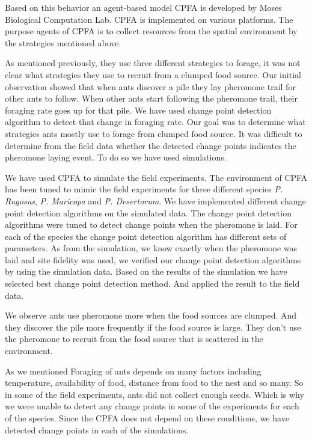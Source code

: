 Based on this behavior an agent-based model CPFA\cite{hecker2015beyond} is developed by Moses Biological Computation Lab. CPFA is implemented on various platforms. The purpose agents of CPFA is to collect resources from the spatial environment by the strategies mentioned above. 

As mentioned previously, they use three different strategies to forage\cite{collett2010desert,flanagan2012quantifying}, it was not clear what strategies they use to recruit from a clumped food source\cite{tarasewich2002swarm}. Our initial observation showed that when ants discover a pile they lay pheromone trail for other ants to follow. When other ants start following the pheromone trail, their foraging rate goes up for that pile. We have used change point detection algorithm to detect that change in foraging rate. Our goal was to determine what strategies ants mostly use to forage from clumped food source. It was difficult to determine from the field data whether the detected change points indicates the pheromone laying event. To do so we have used simulations. 

We have used CPFA to simulate the field experiments. The environment of CPFA has been tuned to mimic the field experiments for three different species \textit{P. Rugosus}, \textit{P. Maricopa} and \textit{P. Desertorum}. We have implemented different change point detection algorithms on the simulated data\cite{fryzlewicz2014wild, scott1974cluster, kukulski2000normal}. The change point detection algorithms were tuned to detect change points when the pheromone is laid. For each of the species the change point detection algorithm has different sets of parameters. As from the simulation, we know exactly when the pheromone was laid and site fidelity was used, we verified our change point detection algorithms by using the simulation data. Based on the results of the simulation we have selected best change point detection method. And applied the result to the field data. 

We observe ants use pheromone more when the food sources are clumped. And they discover the pile more frequently if the food source is large. They don't use the pheromone to recruit from the food source that is scattered in the environment. 

As we mentioned Foraging of ants depends on many factors including temperature, availability of food, distance from food to the nest and so many\cite{whitford1975factors,gordon1996founding}. So in some of the field experiments, ants did not collect enough seeds. Which is why we were unable to detect any change points in some of the experiments for each of the species. Since the CPFA does not depend on these conditions, we have detected change points in each of the simulations.
\clearpage
